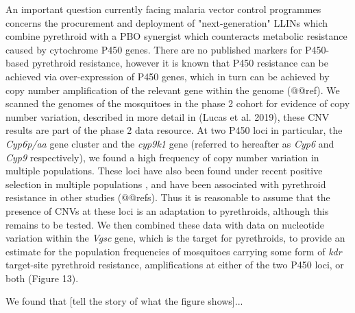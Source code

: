 \documentclass[a4paper,11pt,abstracton,hidelinks]{scrartcl}
\begin{document}
%
An important question currently facing malaria vector control programmes concerns the procurement and deployment of "next-generation" LLINs which combine pyrethroid with a PBO synergist which counteracts metabolic resistance caused by cytochrome P450 genes.
%
There are no published markers for P450-based pyrethroid resistance, however it is known that P450 resistance can be achieved via over-expression of P450 genes, which in turn can be achieved by copy number amplification of the relevant gene within the genome (@@ref).
%
We scanned the genomes of the mosquitoes in the phase 2 cohort for evidence of copy number variation, described in more detail in (Lucas et al. 2019), these CNV results are part of the phase 2 data resource.
%
At two P450 loci in particular, the \textit{Cyp6p/aa} gene cluster and the \textit{cyp9k1} gene (referred to hereafter as \textit{Cyp6} and \textit{Cyp9} respectively), we found a high frequency of copy number variation in multiple populations.
%
These loci have also been found under recent positive selection in multiple populations \cite{Ag1000gConsortium2017}, and have been associated with pyrethroid resistance in other studies (@@refs).
%
Thus it is reasonable to assume that the presence of CNVs at these loci is an adaptation to pyrethroids, although this remains to be tested.
%
We then combined these data with data on nucleotide variation within the \textit{Vgsc} gene, which is the target for pyrethroids, to provide an estimate for the population frequencies of mosquitoes carrying some form of \textit{kdr} target-site pyrethroid resistance, amplifications at either of the two P450 loci, or both (Figure 13). 

We found that [tell the story of what the figure shows]...
\end{document}
